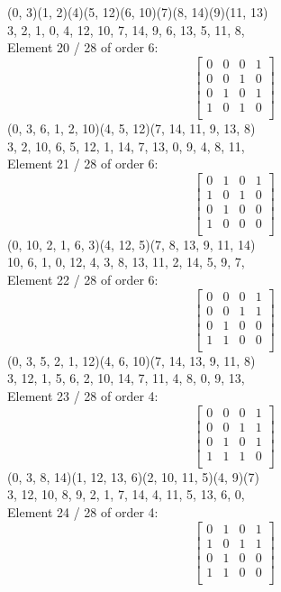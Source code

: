 (0, 3)(1, 2)(4)(5, 12)(6, 10)(7)(8, 14)(9)(11, 13)\\
3, 2, 1, 0, 4, 12, 10, 7, 14, 9, 6, 13, 5, 11, 8, \\
Element    20 / 28 of order 6:
$$
\left[
\begin{array}{*{4}{r}}
0 & 0 & 0 & 1\\
0 & 0 & 1 & 0\\
0 & 1 & 0 & 1\\
1 & 0 & 1 & 0\\
\end{array}
\right]
$$
(0, 3, 6, 1, 2, 10)(4, 5, 12)(7, 14, 11, 9, 13, 8)\\
3, 2, 10, 6, 5, 12, 1, 14, 7, 13, 0, 9, 4, 8, 11, \\
Element    21 / 28 of order 6:
$$
\left[
\begin{array}{*{4}{r}}
0 & 1 & 0 & 1\\
1 & 0 & 1 & 0\\
0 & 1 & 0 & 0\\
1 & 0 & 0 & 0\\
\end{array}
\right]
$$
(0, 10, 2, 1, 6, 3)(4, 12, 5)(7, 8, 13, 9, 11, 14)\\
10, 6, 1, 0, 12, 4, 3, 8, 13, 11, 2, 14, 5, 9, 7, \\
Element    22 / 28 of order 6:
$$
\left[
\begin{array}{*{4}{r}}
0 & 0 & 0 & 1\\
0 & 0 & 1 & 1\\
0 & 1 & 0 & 0\\
1 & 1 & 0 & 0\\
\end{array}
\right]
$$
(0, 3, 5, 2, 1, 12)(4, 6, 10)(7, 14, 13, 9, 11, 8)\\
3, 12, 1, 5, 6, 2, 10, 14, 7, 11, 4, 8, 0, 9, 13, \\
Element    23 / 28 of order 4:
$$
\left[
\begin{array}{*{4}{r}}
0 & 0 & 0 & 1\\
0 & 0 & 1 & 1\\
0 & 1 & 0 & 1\\
1 & 1 & 1 & 0\\
\end{array}
\right]
$$
(0, 3, 8, 14)(1, 12, 13, 6)(2, 10, 11, 5)(4, 9)(7)\\
3, 12, 10, 8, 9, 2, 1, 7, 14, 4, 11, 5, 13, 6, 0, \\
Element    24 / 28 of order 4:
$$
\left[
\begin{array}{*{4}{r}}
0 & 1 & 0 & 1\\
1 & 0 & 1 & 1\\
0 & 1 & 0 & 0\\
1 & 1 & 0 & 0\\
\end{array}
\right]
$$

